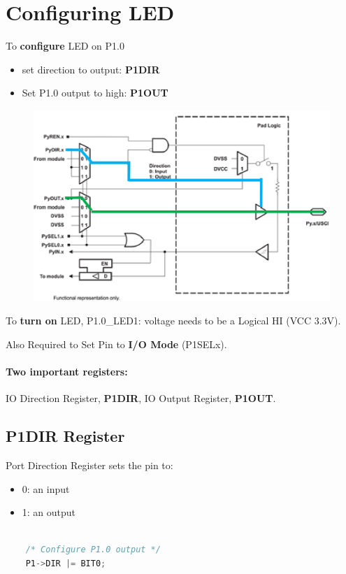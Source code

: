 \section{Configuring LED}

To \textbf{configure} LED on P1.0

\begin{itemize}
    \item set direction to output: \textbf{P1DIR}
    \item Set P1.0 output to high: \textbf{P1OUT}
\end{itemize}


\begin{figure}[H]
    \centering
    \includegraphics[width=0.7\linewidth]{img/image60.png}
\end{figure}

To\textbf{ turn on} LED, P1.0\_LED1: voltage needs to be a Logical HI (VCC 3.3V).

Also Required to Set Pin to \textbf{I/O Mode} (P1SELx).

\paragraph{Two important registers:} IO Direction Register, \textbf{P1DIR}, IO Output Register, \textbf{P1OUT}.

\subsection{P1DIR Register}

Port Direction Register sets the
pin to:

\begin{itemize}
    \item 0: an input
    \item 1: an output
\end{itemize}

\begin{lstlisting}[language=c++]

    /* Configure P1.0 output */
    P1->DIR |= BIT0; 
\end{lstlisting}


